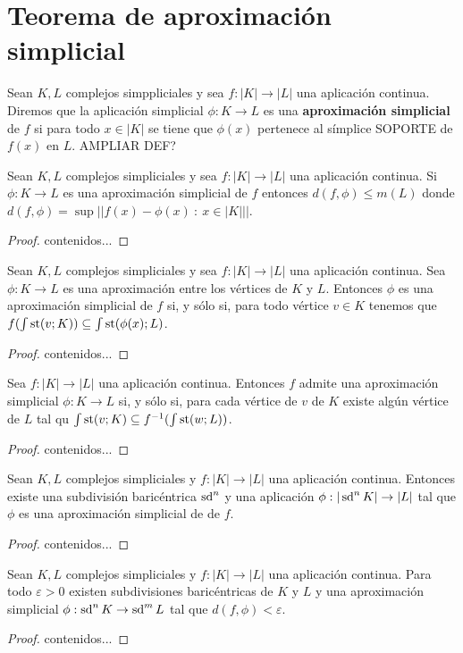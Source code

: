 \section{Teorema de aproximación simplicial}
\begin{definicion}
	Sean $K, L$ complejos simppliciales y sea $f: |K| \to |L|$ una aplicación continua. Diremos que la aplicación simplicial $\phi: K \to L$ es una \textbf{aproximación simplicial} de $f$ si para todo $x \in |K|$ se tiene que $\phi(x)$ pertenece al símplice SOPORTE de $f(x)$ en $L$. AMPLIAR DEF?
\end{definicion}

\begin{proposicion}
	Sean $K, L$ complejos simpliciales y sea $f: |K| \to |L|$ una aplicación continua. Si  $\phi: K \to L$ es una aproximación simplicial de $f$ entonces $d(f,\phi) \leq m(L)$ donde $d(f,\phi) = \sup{||f(x) - \phi(x)\ : \ x \in |K|||}$.
\end{proposicion}
\begin{proof}
	contenidos...
\end{proof}
\begin{proposicion}
	Sean $K, L$ complejos simpliciales y sea $f: |K| \to |L|$ una aplicación continua. Sea  $\phi: K \to L$ es una aproximación entre los vértices de $K$ y $L$. Entonces $\phi$ es una aproximación simplicial de $f$ si, y sólo si, para todo vértice $v \in K$ tenemos que $f( \int\operatorname{st}(v;K)) \subseteq \int \operatorname{st}(\phi(x);L)$.
\end{proposicion}
\begin{proof}
	contenidos...
\end{proof}
\begin{corolario}
	Sea $f: |K| \to |L|$ una aplicación continua. Entonces $f$ admite una aproximación simplicial $\phi : K \to L$ si, y sólo si, para cada vértice de $v$ de $K$ existe algún vértice de $L$ tal qu $\int \operatorname{st}(v;K) \subseteq f^{-1}(\int \operatorname{st}(w;L))$.
\end{corolario}
\begin{proof}
	contenidos...
\end{proof}
\begin{teorema}
	Sean $K,L$ complejos simpliciales y $f: |K| \to |L|$ una aplicación continua. Entonces existe una subdivisión baricéntrica $\operatorname{sd}^n$ y una aplicación $\phi : |\operatorname{sd}^n K| \to |L|$ tal que $\phi$ es una aproximación simplicial de de $f$.
\end{teorema}
\begin{proof}
	contenidos...
\end{proof}
\begin{corolario}
	Sean $K,L$ complejos simpliciales y $f: |K| \to |L|$ una aplicación continua. Para todo $\varepsilon > 0$ existen subdivisiones baricéntricas de $K$ y $L$ y una aproximación simplicial $\phi : \operatorname{sd}^n K \to \operatorname{sd}^m L$ tal que $d(f,\phi) < \varepsilon$.
\end{corolario}
\begin{proof}
	contenidos...
\end{proof}

